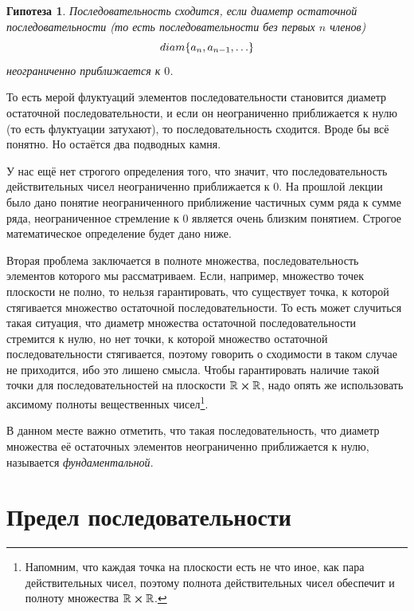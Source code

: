 \documentclass[12pt]{article}
\newtheorem{hypothesis}{Гипотеза}[section]
\begin{document}
\begin{hypothesis}
Последовательность сходится, если диаметр остаточной последовательности (то есть последовательности без первых $n$ членов)
\begin{equation}
    diam\qty{a_n, a_{n-1}, \ldots}
\end{equation}
неограниченно приближается к $0$.
\end{hypothesis}
То есть мерой флуктуаций элементов последовательности становится диаметр остаточной последовательности, и если он неограниченно приближается к нулю (то есть флуктуации затухают), то последовательность сходится. Вроде бы всё понятно. Но остаётся два подводных камня.
\par
У нас ещё нет строгого определения того, что значит, что последовательность действительных чисел неограниченно приближается к $0$. На прошлой лекции было дано понятие неограниченного приближение частичных сумм ряда к сумме ряда, неограниченное стремление к $0$ является очень близким понятием. Строгое математическое определение будет дано ниже.
\par
Вторая проблема заключается в полноте множества, последовательность элементов которого мы рассматриваем. Если, например, множество точек плоскости не полно, то нельзя гарантировать, что существует точка, к которой стягивается множество остаточной последовательности. То есть может случиться такая ситуация, что диаметр множества остаточной последовательности стремится к нулю, но нет точки, к которой множество остаточной последовательности стягивается, поэтому говорить о сходимости в таком случае не приходится, ибо это лишено смысла. Чтобы гарантировать наличие такой точки для последовательностей на плоскости $\mathbb{R}\cross \mathbb{R}$, надо опять же использовать аксимому полноты вещественных чисел\footnote{Напомним, что каждая точка на плоскости есть не что иное, как пара действительных чисел, поэтому полнота действительных чисел обеспечит и полноту множества $\mathbb{R}\cross \mathbb{R}$.}.
\par
В данном месте важно отметить, что такая последовательность, что диаметр множества её остаточных элементов неограниченно приближается к нулю, называется \emph{фундаментальной}.

\section{Предел последовательности}
\end{document}
